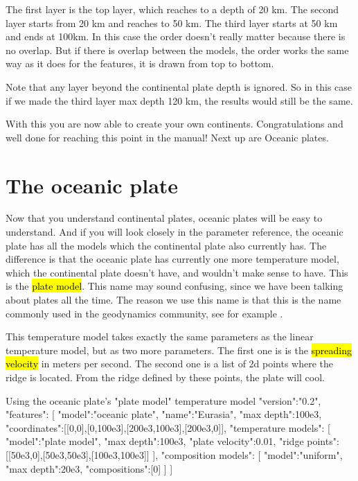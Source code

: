 \documentclass{book}
\begin{document}
The first layer is the top layer, which reaches to a depth of 20 km. The second layer starts from 20 km and reaches to 50 km. The third layer starts at 50 km and ends at 100km. In this case the order doesn't really matter because there is no overlap. But if there is overlap between the models, the order works the same way as it does for the features, it is drawn from top to bottom.

\begin{remark}
Note that any layer beyond the continental plate depth is ignored. So in this case if we made the third layer max depth 120 km, the results would still be the same.
\end{remark}

With this you are now able to create your own continents. Congratulations and well done for reaching this point in the manual! Next up are Oceanic plates.

\section{The oceanic plate}
Now that you understand continental plates, oceanic plates will be easy to understand. And if you will look closely in the parameter reference, the oceanic plate has all the models which the continental plate also currently has. The difference is that the oceanic plate has currently one more temperature model, which the continental plate doesn't have, and wouldn't make sense to have. This is the \hl{plate model}. This name may sound confusing, since we have been talking about plates all the time. The reason we use this name is that this is the name commonly used in the geodynamics community, see for example \cite{fowler2005}. 

This temperature model takes exactly the same parameters as the linear temperature model, but as two more parameters. The first one is is the \hl{spreading velocity} in meters per second. The second one is a list of 2d points where the ridge is located. From the ridge defined by these points, the plate will cool.

\begin{javascriptcode}{Using the oceanic plate's "plate model" temperature model}{}
{
  "version":"0.2",
  "features":
  [
    {
      "model":"oceanic plate", "name":"Eurasia", "max depth":100e3,
      "coordinates":[[0,0],[0,100e3],[200e3,100e3],[200e3,0]],
      "temperature models":
      [
        {
          "model":"plate model", "max depth":100e3, "plate velocity":0.01,
          "ridge points":[[50e3,0],[50e3,50e3],[100e3,100e3]]
        }
      ],
      "composition models":
      [
        {"model":"uniform", "max depth":20e3, "compositions":[0]}
      ]
    }
  ]
}
\end{javascriptcode}
\end{document}
